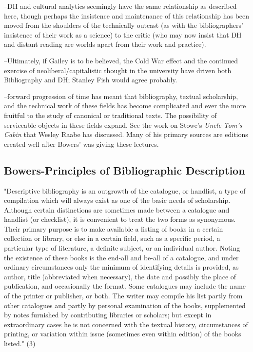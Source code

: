 \documentclass[course, english]{Notes}
\newcommand{\n}{\scalebox{2}{\textbf{\framebox{$\aleph$} } } }
\begin{document}
\n --DH and cultural analytics seemingly have the same relationship as described here, though perhaps the insistence and maintenance of this relationship has been moved from the shoulders of the technically outcast (as with the bibliographers' insistence of their work as a science) to the critic (who may now insist that DH and distant reading are worlds apart from their work and practice).
	
\n --Ultimately, if Gailey is to be believed, the Cold War effect and the continued exercise of neoliberal/capitalistic thought in the university have driven both Bibliography and DH; Stanley Fish would agree probably.
	
\n --forward progression of time has meant that bibliography, textual scholarship, and the technical work of these fields has become complicated and ever the more fruitful to the study of canonical or traditional texts. The possibility of serviceable objects in these fields expand. See the work on Stowe's \emph{Uncle Tom's Cabin} that Wesley Raabe has discussed. Many of his primary sources are editions created well after Bowers' was giving these lectures.

\subsection{Bowers-Principles of Bibliographic Description}
\1 "Descriptive bibliography is an outgrowth of the catalogue, or handlist, a type of compilation which will always exist as one of the basic needs of scholarship. Although certain distinctions are sometimes made between a catalogue and handlist (or checklist), it is convenient to treat the two forms as synonymous. Their primary purpose is to make available a listing of books in a certain collection or library, or else in a certain field, such as a specific period, a particular type of literature, a definite subject, or an individual author. Noting the existence of these books is the end-all and be-all of a catalogue, and under ordinary circumstances only the minimum of identifying details is provided, as author, title (abbreviated when necessary), the date and possibly the place of publication, and occasionally the format. Some catalogues may include the name of the printer or publisher, or both. The writer may compile his list partly from other catalogues and partly by personal examination of the books, supplemented by notes furnished by contributing libraries or scholars; but except in extraordinary cases he is not concerned with the textual history, circumstances of printing, or variation within issue (sometimes even within edition) of the books listed." (3)
\end{document}
